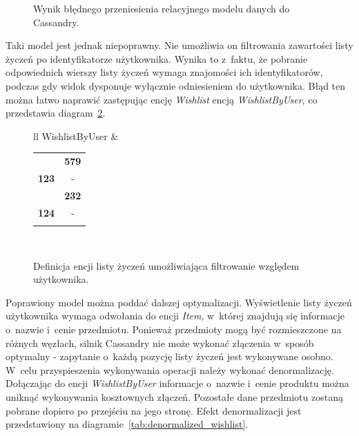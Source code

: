 \begin{figure}[ht!]
	\caption{Wynik błędnego przeniesienia relacyjnego modelu danych do Cassandry.}
	\label{tab:bad_cassandra_data_model}
\end{figure}

Taki model jest jednak niepoprawny. Nie umożliwia on filtrowania zawartości listy życzeń po identyfikatorze użytkownika. Wynika to z~faktu, że pobranie odpowiednich wierszy listy życzeń wymaga znajomości ich identyfikatorów, podczas gdy widok dysponuje wyłącznie odniesieniem do użytkownika. Błąd ten można łatwo naprawić zastępując encję \emph{Wishlist} encją \emph{WishlistByUser}, co przedstawia diagram~\ref{tab:wishlist_by_user_model_fix}.

\begin{figure}[ht!]
	\centering

	\begin{tabular}{ll}
		WishlistByUser &
		\begin{tabular}{|l||c|}
			\hhline{|-||-|}
			& \textbf{579} \\
			\hhline{|~||=|}
			\textbf{123} & - \\
			\hhline{=::=}
			& \textbf{232} \\
			\hhline{|~||=|}
			\textbf{124} & - \\
			\hhline{|-||-|}
		\end{tabular} \\
	\end{tabular}

	\caption{Definicja encji listy życzeń umożliwiająca filtrowanie względem użytkownika.}
	\label{tab:wishlist_by_user_model_fix}
\end{figure}

Poprawiony model można poddać dalszej optymalizacji. Wyświetlenie listy życzeń użytkownika wymaga odwołania do encji \emph{Item}, w~której znajdują się informacje o~nazwie i~cenie przedmiotu. Ponieważ przedmioty mogą być rozmieszczone na różnych węzłach, silnik Cassandry nie może wykonać złączenia w~sposób optymalny - zapytanie o~każdą pozycję listy życzeń jest wykonywane osobno. W~celu przyspieszenia wykonywania operacji należy wykonać denormalizację. Dołączając do encji \emph{WishlistByUser} informacje o~nazwie i~cenie produktu można uniknąć wykonywania kosztownych złączeń. Pozostałe dane przedmiotu zostaną pobrane dopiero po przejściu na jego stronę. Efekt denormalizacji jest przedstawiony na diagramie~\ref{tab:denormalized_wishlist}.

